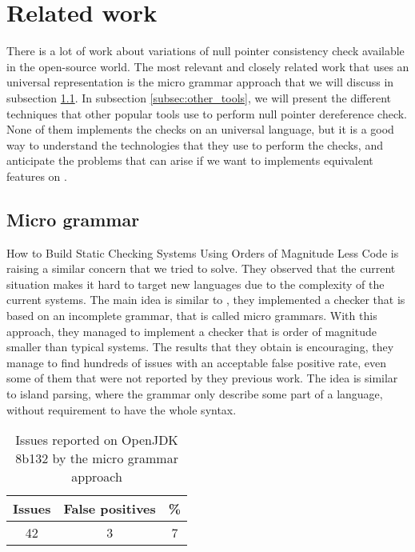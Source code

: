 \section{Related work}
\label{sec:related_work}

There is a lot of work about variations of null pointer consistency check available in the open-source world.
The most relevant and closely related work that uses an universal representation is the micro grammar approach \cite{Brown:2016:BSC:2954679.2872364} that we will discuss in subsection \ref{subsec:micro_grammar}.
In subsection \ref{subsec:other_tools}, we will present the different techniques that other popular tools use to perform null pointer dereference check.
None of them implements the checks on an universal language, but it is a good way to understand the technologies that they use to perform the checks, and anticipate the problems that can arise if we want to implements equivalent features on \slang{}.

\subsection{Micro grammar}
\label{subsec:micro_grammar}

How to Build Static Checking Systems Using Orders of Magnitude Less Code \cite{Brown:2016:BSC:2954679.2872364} is raising a similar concern that we tried to solve. 
They observed that the current situation makes it hard to target new languages due to the complexity of the current systems. 
The main idea is similar to \slang{}, they implemented a checker that is based on an incomplete grammar, that is called micro grammars.
With this approach, they managed to implement a checker that is order of magnitude smaller than typical systems.
The results that they obtain is encouraging, they manage to find hundreds of issues with an acceptable false positive rate, even some of them that were not reported by they previous work. 
The idea is similar to island parsing, where the grammar only describe some part of a language, without requirement to have the whole syntax.

\begin{table}[h]
	\centering
	\caption{Issues reported on OpenJDK 8b132 by the micro grammar approach}
	\label{table:micro_grammar_issues}
	\begin{tabular}{|c|c|c|}
		\hline
		\bf Issues & \bf False positives & \bf \% \\ \hline
		42 &  3 &  7 \\ \hline
	\end{tabular}
\end{table}

